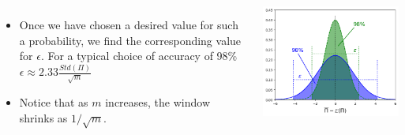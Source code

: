 \documentclass{beamer}
\begin{document}
\begin{frame}
  \begin{columns}
    \begin{itemize}
    \item Once we have chosen a desired value for such a probability, we find the corresponding value for $\epsilon$. For a typical choice of accuracy of 98\% $\epsilon \approx 2.33 \frac{Std(\Pi)}{\sqrt{m}}$
    \item Notice that as $m$ increases, the window shrinks as $1/\sqrt{m}$.
    \end{itemize}
    \includegraphics[width=0.9\linewidth]{confidence_interval}
  \end{columns}
\end{frame}
\end{document}
